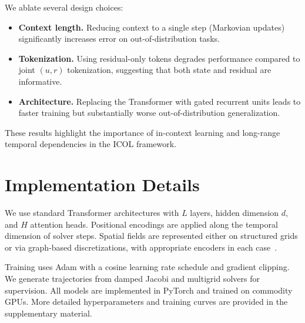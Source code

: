 \documentclass{article}
\begin{document}
We ablate several design choices:
\begin{itemize}
\item \textbf{Context length.} Reducing context to a single step (Markovian updates) significantly increases error on out-of-distribution tasks.
\item \textbf{Tokenization.} Using residual-only tokens degrades performance compared to joint $(u,r)$ tokenization, suggesting that both state and residual are informative.
\item \textbf{Architecture.} Replacing the Transformer with gated recurrent units leads to faster training but substantially worse out-of-distribution generalization.
\end{itemize}

These results highlight the importance of in-context learning and long-range temporal dependencies in the ICOL framework.

\section{Implementation Details}
\label{app:impl}

We use standard Transformer architectures with $L$ layers, hidden dimension $d$, and $H$ attention heads. Positional encodings are applied along the temporal dimension of solver steps. Spatial fields are represented either on structured grids or via graph-based discretizations, with appropriate encoders in each case~\cite{bhattacharya2021meshgraphnet,pfau2020neuralfields}.

Training uses Adam with a cosine learning rate schedule and gradient clipping. We generate trajectories from damped Jacobi and multigrid solvers for supervision. All models are implemented in PyTorch and trained on commodity GPUs. More detailed hyperparameters and training curves are provided in the supplementary material.
\end{document}
